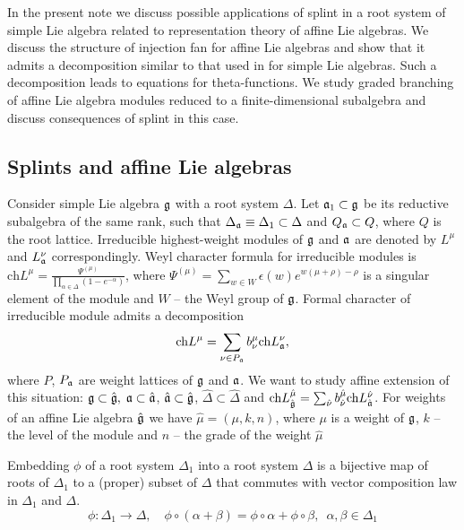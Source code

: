 In the present note we discuss possible applications of splint in
a root system of simple Lie algebra related to representation
theory of affine Lie algebras. We discuss the structure of
injection fan for affine Lie algebras and show that it admits a
decomposition similar to that used in \cite{2011arXiv1111.6787L}
for simple Lie algebras. Such a decomposition leads to equations
for theta-functions. We study graded branching of affine Lie
algebra modules reduced to a finite-dimensional subalgebra and
discuss consequences of splint in this case.

\subsection{Splints and affine Lie algebras}
\label{sec:definitions}

Consider simple Lie algebra $\mathfrak{g}$ with a root system $\Delta$. Let
$\mathfrak{a}_{1}\subset \mathfrak{g}$ be its reductive subalgebra of the same rank, such that
$\Delta_{\mathfrak{a}}\equiv\Delta_{1}\subset\Delta$ and $Q_{\mathfrak{a}}\subset Q$, where $Q$ is the root lattice. Irreducible highest-weight modules of
$\mathfrak{g}$ and $\mathfrak{a}$ are denoted by $L^{\mu}$ and $L^{\nu}_{\mathfrak{a}}$
correspondingly. Weyl character formula for irreducible modules is
$\mathrm{ch}L^{\mu}=\frac{\Psi^{(\mu)}}{\prod_{\alpha\in\Delta}(1-e^{-\alpha})}$,
where $\Psi^{(\mu)}=\sum_{w\in W}\epsilon(w) e^{w(\mu+\rho)-\rho}$
is a singular element of the module and $W$ -- the Weyl group of
$\mathfrak{g}$. Formal character of irreducible module admits a
decomposition
\begin{equation}
  \label{eq:133}
  \mathrm{ch} L^{\mu}=\sum_{\nu\in P_{\mathfrak{a}}} b^{\mu}_{\nu} \mathrm{ch} L^{\nu}_{\mathfrak{a}},
\end{equation}
where $P$, $P_{\mathfrak{a}}$ are weight lattices of $\mathfrak{g}$ and $\mathfrak{a}$. We
want to study affine extension of this situation:
$\mathfrak{g}\subset\hat{\mathfrak{g}},\; \mathfrak{a}\subset\hat{\mathfrak{a}}$, $\hat{\mathfrak{a}}\subset\hat{\mathfrak{g}}$,
$\hat{\Delta}\subset\hat{\Delta}$ and
$\mathrm{ch}L^{\hat{\mu}}_{\hat{\mathfrak{g}}}=\sum_{\hat{\nu}}
b^{\hat{\mu}}_{\hat{\nu}} \mathrm{ch} L^{\hat{\nu}}_{\hat{\mathfrak{a}}}$. For
weights of an affine Lie algebra $\hat{\mathfrak{g}}$ we have
$\hat{\mu}=(\mu,k,n)$, where $\mu$ is a weight of $\mathfrak{g}$, $k$ --
the level of the module and $n$ -- the grade of the weight
$\hat{\mu}$

\begin{Def}
  Embedding $\phi$ of a root system $\Delta_1$ into a root system $\Delta$ is a bijective map of
  roots of $\Delta_{1}$ to a (proper) subset of $\Delta$ that commutes with vector composition law
  in $\Delta_{1}$ and $\Delta$.
\begin{equation*}
\phi:\Delta_1 \longrightarrow \Delta, \quad \phi \circ (\alpha + \beta) =\phi \circ \alpha + \phi \circ \beta,\,\,\, \alpha,\beta \in \Delta_1
\end{equation*}
\end{Def}

